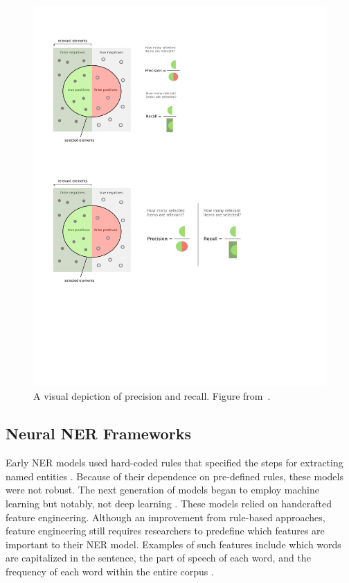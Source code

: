 \begin{figure}[h]
	\centering
	\includegraphics[width=0.85\linewidth]{LatexDiss/figures/evaluationmetrics.pdf}
	\caption{A visual depiction of precision and recall. Figure from~\cite{NERevaluationmetrics}.}
	\label{fig:evaluationmetrics}
\end{figure}



\subsection{Neural NER Frameworks}
\label{sec:neuralNER}
Early NER models used hard-coded rules that specified the steps for extracting named entities \citep{NeuralNERSurvey}. Because of their dependence on pre-defined rules, these models were not robust. The next generation of models began to employ machine learning but notably, not deep learning \citep{NeuralNERSurvey}. These models relied on handcrafted feature engineering.
Although an improvement from rule-based approaches, feature engineering still requires researchers to predefine which features are important to their NER model. Examples of such features include which words are capitalized in the sentence, the part of speech of each word, and the frequency of each word within the entire corpus \citep{2007Survey}.

